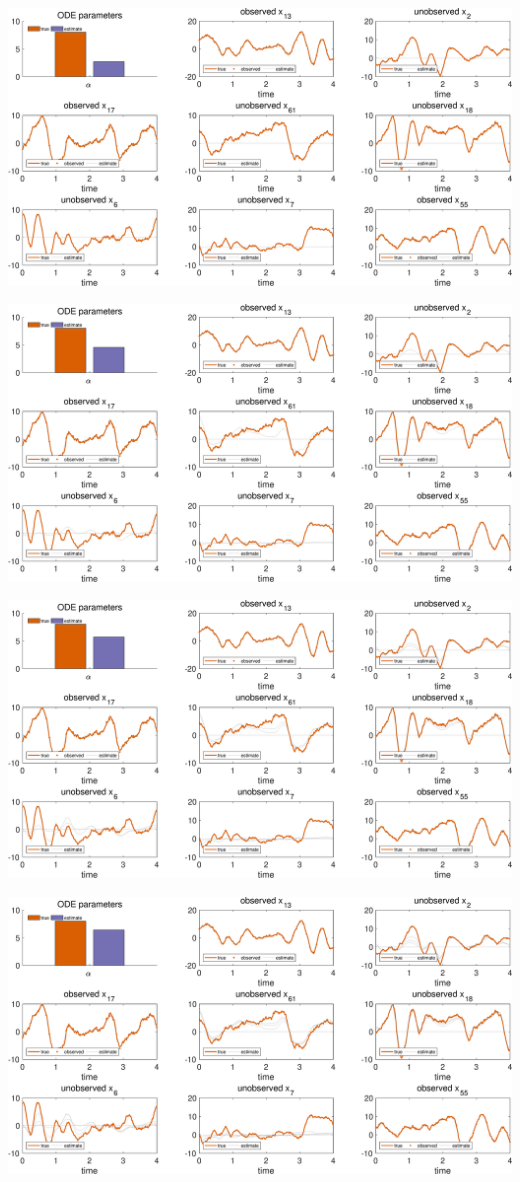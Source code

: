 {\centering

\includegraphics [width=5.5in]{VGM_for_Lorenz96_02.eps}

\includegraphics [width=5.5in]{VGM_for_Lorenz96_03.eps}

\includegraphics [width=5.5in]{VGM_for_Lorenz96_04.eps}

\includegraphics [width=5.5in]{VGM_for_Lorenz96_05.eps}

}
